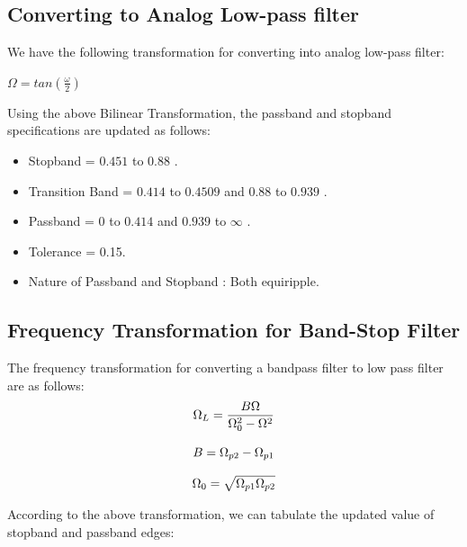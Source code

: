 \documentclass{article}
\begin{document}
\subsection{Converting to Analog Low-pass filter}
We have the following transformation for converting into analog low-pass filter:\\
\begin{center}
    $\Omega = tan(\frac{\omega}{2})$\\
\end{center}

Using the above Bilinear Transformation, the passband and stopband specifications are updated as follows:\\

\begin{itemize}
    \item Stopband = $0.451$ to $0.88$ .
    \item Transition Band = $0.414$ to $0.4509$ and $0.88$ to $0.939$ .
    \item Passband = $0$ to $0.414$  and $0.939$ to $\infty$ .
    \item Tolerance = 0.15.
    \item Nature of Passband and Stopband : Both equiripple.
\end{itemize}

\subsection{Frequency Transformation for Band-Stop Filter}
The frequency transformation for converting a bandpass filter to low pass filter are as follows:\\

\begin{equation}
    \Omega _{L} = \frac{B\Omega}{\Omega_{0}^{2} - \Omega^{2}}  \\
\end{equation}

\begin{equation}
    B = \Omega _{p2} - \Omega _{p1} \\
\end{equation}

\begin{equation}
    \Omega _{0} = \sqrt{\Omega _{p1}\Omega _{p2}}\\
\end{equation}

According to the above transformation, we can tabulate the updated value of stopband and passband edges:\\
\end{document}
